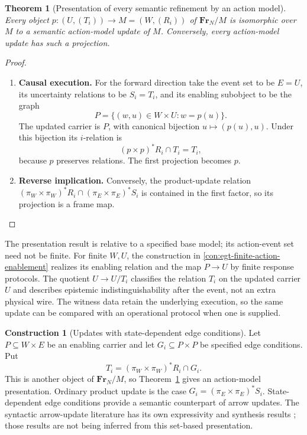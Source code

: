 \documentclass[11pt,a4paper]{article}
\numberwithin{equation}{section}
\newtheorem{theorem}{Theorem}[section]
\theoremstyle{definition}
\newtheorem{construction}[construction]{Construction}
\theoremstyle{remark}
\theoremstyle{plain}
\begin{document}
\begin{theorem}[Presentation of every semantic refinement by an action model]
\label{thm:egt-action-presentation}
Every object $p:(U,(T_i))\to M=(W,(R_i))$ of $\mathbf{Fr}_N/M$ is
isomorphic over $M$ to a semantic action-model update of $M$.
Conversely, every action-model update has such a projection.
\end{theorem}
\begin{proof}
\leavevmode
\begin{enumerate}[label=\textup{(\arabic*)},leftmargin=*,itemsep=4pt,topsep=3pt]
  \item \textbf{Causal execution.} For the forward direction take the event set to be $E=U$, its uncertainty
relations to be $S_i=T_i$, and its enabling subobject to be the graph
\[
 P=\{(w,u)\in W\times U:w=p(u)\}.
\]
The updated carrier is $P$, with canonical bijection
$u\mapsto(p(u),u)$. Under this bijection its $i$-relation is
\[
 (p\times p)^*R_i\cap T_i=T_i,
\]
because $p$ preserves relations. The first projection becomes $p$.
  \item \textbf{Reverse implication.} Conversely, the product-update relation
$(\pi_W\times\pi_W)^*R_i\cap(\pi_E\times\pi_E)^*S_i$
is contained in the first factor, so its projection is a frame map.
\end{enumerate}
\end{proof}

The presentation result is relative to a specified base model;
its action-event set need not be finite. For finite $W,U$, the
construction in \cref{con:egt-finite-action-enablement} realizes
its enabling relation and the map $P\to U$ by finite response
protocols. The quotient $U\to U/T_i$ classifies the relation $T_i$ on
the updated carrier $U$ and describes epistemic indistinguishability after the event, not an extra physical wire.
The witness data retain the underlying execution, so the same update can
be compared with an operational protocol when one is supplied.

\begin{construction}[Updates with state-dependent edge conditions]
\label{con:egt-edge-guard-update}
Let $P\subseteq W\times E$ be an enabling carrier and let
$G_i\subseteq P\times P$ be specified edge conditions. Put
\[
 T_i=(\pi_W\times\pi_W)^*R_i\cap G_i.
\]
This is another object of $\mathbf{Fr}_N/M$, so Theorem~\ref{thm:egt-action-presentation}
gives an action-model presentation. Ordinary product update is the case
$G_i=(\pi_E\times\pi_E)^*S_i$. State-dependent edge conditions
provide a semantic counterpart of arrow updates. The syntactic arrow-update
literature has its own expressivity and synthesis results
\citep{VanDitmarschEtAl2020ArrowUpdateSynthesis};
those results are not being inferred from this set-based presentation.
\end{construction}
\end{document}
